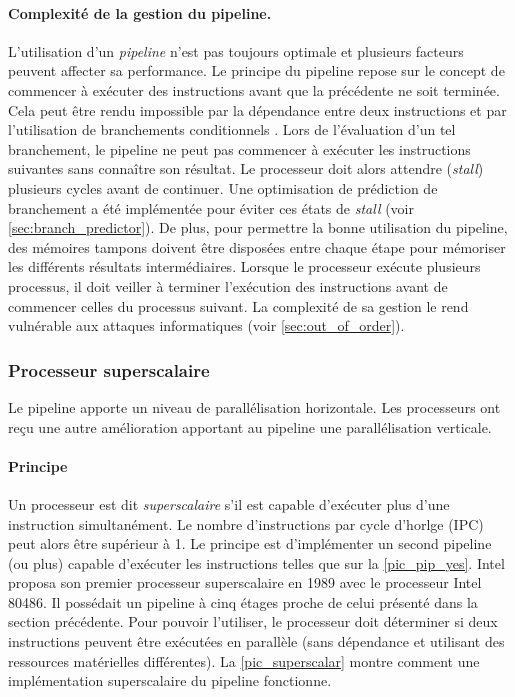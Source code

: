\paragraph{Complexité de la gestion du pipeline.}
L'utilisation d'un \textit{pipeline} n'est pas toujours optimale et plusieurs facteurs peuvent affecter sa performance. Le principe du pipeline repose sur le concept de commencer à exécuter des instructions avant que la précédente ne soit terminée. Cela peut être rendu impossible par la dépendance entre deux instructions et par l'utilisation de branchements conditionnels \cite{emma1987characterization}. Lors de l'évaluation d'un tel branchement, le pipeline ne peut pas commencer à exécuter les instructions suivantes sans connaître son résultat. Le processeur doit alors attendre (\textit{stall}) plusieurs cycles avant de continuer. Une optimisation de prédiction de branchement a été implémentée pour éviter ces états de \textit{stall} (voir \autoref{sec:branch_predictor}). De plus, pour permettre la bonne utilisation du pipeline, des mémoires tampons doivent être disposées entre chaque étape pour mémoriser les différents résultats intermédiaires. Lorsque le processeur exécute plusieurs processus, il doit veiller à terminer l'exécution des instructions avant de commencer celles du processus suivant. La complexité de sa gestion le rend vulnérable aux attaques informatiques (voir \autoref{sec:out_of_order}). 













\subsubsection{Processeur superscalaire} \label{sec:superscalar}

Le pipeline apporte un niveau de parallélisation horizontale. Les processeurs ont reçu une autre amélioration apportant au pipeline une parallélisation verticale. 

\paragraph{Principe}
Un processeur est dit \textit{superscalaire} s'il est capable d'exécuter plus d'une instruction simultanément. Le nombre d'instructions par cycle d'horlge (IPC) peut alors être supérieur à 1. Le principe est d'implémenter un second pipeline (ou plus) capable d'exécuter les instructions telles que sur la \autoref{pic_pip_yes}. Intel proposa son premier processeur superscalaire en 1989 avec le processeur Intel 80486. Il possédait un pipeline à cinq étages proche de celui présenté dans la section précédente. 
Pour pouvoir l'utiliser, le processeur doit déterminer si deux instructions peuvent être exécutées en parallèle (sans dépendance et utilisant des ressources matérielles différentes). La \autoref{pic_superscalar} montre comment une implémentation superscalaire du pipeline fonctionne. 

